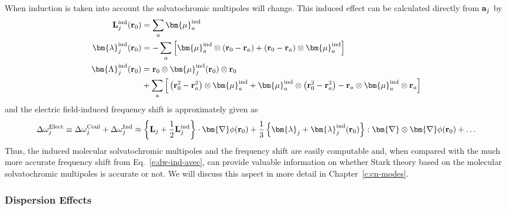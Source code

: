 \documentclass[a4paper,titlepage,twoside,fleqn,12pt]{book}
\newcommand{\BM}[1]{\bm{#1}}
\begin{document}
\begin{refsection}
When induction is taken into account the solvatochromic multipoles
will change. This induced effect can be calculated directly from
${\bf a}_j$ by
%
\begin{subequations}
\begin{align}
{\bf L}_j^{\rm ind}({\bf r}_0)       &=   \sum_a {\BM \mu}_a^{\rm ind} \label{e:34e1} \\
{\BM \lambda}_j^{\rm ind}({\bf r}_0) &= - \sum_a \Big[ {\BM \mu}_a^{\rm ind} \otimes \left( {\bf r}_0 
                                       - {\bf r}_a \right) + \left( {\bf r}_0 
                                       - {\bf r}_a \right) \otimes {\BM \mu}_a^{\rm ind} \Big] \label{e:34e2} \\
{\BM \Lambda}_j^{\rm ind}({\bf r}_0) &=   {\bf r}_0 \otimes {\BM \mu}_j^{\rm ind}({\bf r}_0) \otimes {\bf r}_0 \nonumber \\ 
                                    &  + \sum_a \Big[ \left( {\bf r}_0^2 - {\bf r}_a^2 \right) \otimes {\BM \mu}_a^{\rm ind} 
                                       + {\BM \mu}_a^{\rm ind} \otimes \left( {\bf r}_0^2 - {\bf r}_a^2 \right) 
                                       - {\bf r}_a \otimes {\BM \mu}_a^{\rm ind} \otimes {\bf r}_a \Big] \label{e:34e3}
\end{align}
\end{subequations}
%
and the electric field\hyp{}induced frequency shift 
is approximately given as
%
\begin{equation} \label{e:dmtp-solmmm-ind}
 \Delta\omega_j^{\rm Elect} \equiv  \Delta\omega_j^{\rm Coul} +  \Delta\omega_j^{\rm Ind} \approx  
                       \left\{ {\bf L}_j + \frac{1}{2} {\bf L}_j^{\rm ind} \right\} 
                       \cdot {\BM \nabla} \phi({\bf r}_0)   + 
      \frac{1}{3} \left\{ {\BM \lambda}_j + {\BM \lambda}_j^{\rm ind}({\bf r}_0) \right\} 
                           : {\BM \nabla} \otimes {\BM \nabla} \phi({\bf r}_0)   +   \ldots
\end{equation}
%
Thus, the induced molecular solvatochromic multipoles and the frequency shift
are easily computable and, when compared with the much more accurate
frequency shift from Eq.~\eqref{e:dw-ind-avec}, can provide valuable 
information on whether Stark theory based on the molecular
solvatochromic multipoles is accurate or not. We will discuss 
this aspect in more detail in Chapter~\ref{c:cn-modes}.

\subsubsection{Dispersion Effects\label{s:disp}}


\end{refsection}
\end{document}
